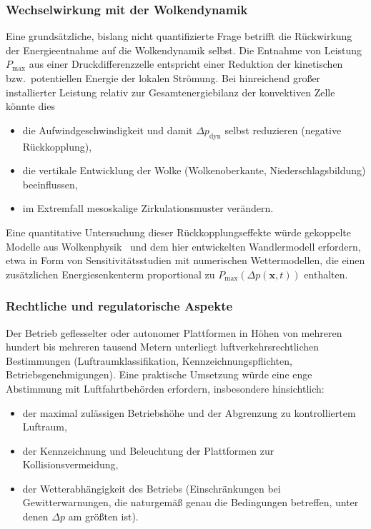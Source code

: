 ﻿\documentclass[a4paper,12pt]{article}
\theoremstyle{definition}
\begin{document}
\subsubsection{Wechselwirkung mit der Wolkendynamik}

Eine grundsätzliche, bislang nicht quantifizierte Frage betrifft die
Rückwirkung der Energieentnahme auf die Wolkendynamik selbst. Die
Entnahme von Leistung $P_{\max}$ aus einer Druckdifferenzzelle entspricht
einer Reduktion der kinetischen bzw.\ potentiellen Energie der lokalen
Strömung. Bei hinreichend großer installierter Leistung relativ zur
Gesamtenergiebilanz der konvektiven Zelle könnte dies
\begin{itemize}
	\item die Aufwindgeschwindigkeit und damit $\Delta p_{\mathrm{dyn}}$
	selbst reduzieren (negative Rückkopplung),
	\item die vertikale Entwicklung der Wolke (Wolkenoberkante,
	Niederschlagsbildung) beeinflussen,
	\item im Extremfall mesoskalige Zirkulationsmuster verändern.
\end{itemize}
Eine quantitative Untersuchung dieser Rückkopplungseffekte würde
gekoppelte Modelle aus Wolkenphysik~\cite{houze2014,emanuel1994} und dem
hier entwickelten Wandlermodell erfordern, etwa in Form von
Sensitivitätsstudien mit numerischen Wettermodellen, die einen zusätzlichen
Energiesenkenterm proportional zu $P_{\max}(\Delta p(\mathbf{x},t))$
enthalten.

\subsubsection{Rechtliche und regulatorische Aspekte}

Der Betrieb geflesselter oder autonomer Plattformen in Höhen von mehreren
hundert bis mehreren tausend Metern unterliegt luftverkehrsrechtlichen
Bestimmungen (Luftraumklassifikation, Kennzeichnungspflichten,
Betriebsgenehmigungen). Eine praktische Umsetzung würde eine enge
Abstimmung mit Luftfahrtbehörden erfordern, insbesondere hinsichtlich:
\begin{itemize}
	\item der maximal zulässigen Betriebshöhe und der Abgrenzung zu
	kontrolliertem Luftraum,
	\item der Kennzeichnung und Beleuchtung der Plattformen zur
	Kollisionsvermeidung,
	\item der Wetterabhängigkeit des Betriebs (Einschränkungen bei
	Gewitterwarnungen, die naturgemäß genau die Bedingungen betreffen,
	unter denen $\Delta p$ am größten ist).
\end{itemize}
\end{document}
